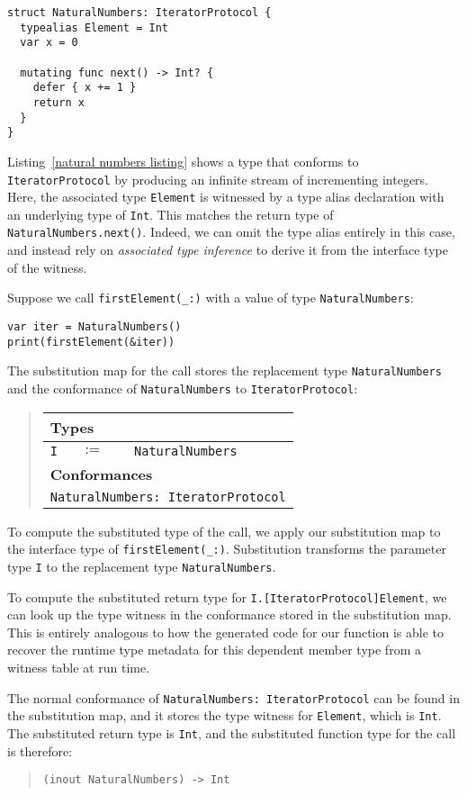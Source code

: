 \documentclass[a4paper,headsepline,bibliography=totoc,toc=flat,fleqn,twoside=semi]{scrbook}
\theoremstyle{definition}
\theoremstyle{definition}
\theoremstyle{definition}
\newcommand{\SubMapC}[2]{\begin{tabular}{|lll|}
\hline
\multicolumn{3}{|l|}{\textbf{Types}}\\
\hline
#1\\
\hline
\hline
\multicolumn{3}{|l|}{\textbf{Conformances}}\\
\hline
#2\\
\hline
\end{tabular}}
\newcommand{\SubType}[2]{\texttt{#1}&$:=$&\texttt{#2}}
\newcommand{\SubConf}[1]{\multicolumn{3}{|l|}{\texttt{#1}}}
\begin{document}
\begin{listing}\label{natural numbers listing}
\begin{Verbatim}
struct NaturalNumbers: IteratorProtocol {
  typealias Element = Int
  var x = 0
  
  mutating func next() -> Int? {
    defer { x += 1 }
    return x
  }
}
\end{Verbatim}
\end{listing}
Listing~\ref{natural numbers listing} shows a type that conforms to \texttt{IteratorProtocol} by producing an infinite stream of incrementing integers.
Here, the associated type \texttt{Element} is witnessed by a type alias declaration with an underlying type of \texttt{Int}. This matches the return type of \texttt{NaturalNumbers.next()}. Indeed, we can omit the type alias entirely in this case, and instead rely on \emph{associated type inference} to derive it from the interface type of the witness.

Suppose we call \verb|firstElement(_:)| with a value of type \texttt{NaturalNumbers}:
\begin{Verbatim}
var iter = NaturalNumbers()
print(firstElement(&iter))
\end{Verbatim}
The substitution map for the call stores the replacement type \texttt{NaturalNumbers} and the conformance of \texttt{NaturalNumbers} to \texttt{IteratorProtocol}:
\begin{quote}
\SubMapC{\SubType{I}{NaturalNumbers}}{\SubConf{NaturalNumbers:\ IteratorProtocol}}
\end{quote}
To compute the substituted type of the call, we apply our substitution map to the interface type of \verb|firstElement(_:)|. Substitution transforms the parameter type \texttt{I} to the replacement type \texttt{NaturalNumbers}.

To compute the substituted return type for \verb|I.[IteratorProtocol]Element|, we can look up the type witness in the conformance stored in the substitution map. This is entirely analogous to how the generated code for our function is able to recover the runtime type metadata for this dependent member type from a witness table at run time.

The normal conformance of \verb|NaturalNumbers: IteratorProtocol| can be found in the substitution map, and it stores the type witness for \verb|Element|, which is \verb|Int|. The substituted return type is \verb|Int|, and the substituted function type for the call is therefore:
\begin{quote}
\begin{verbatim}
(inout NaturalNumbers) -> Int
\end{verbatim}
\end{quote}
\end{document}
